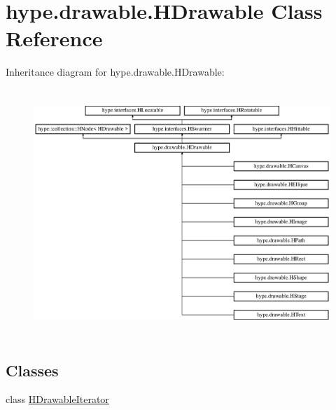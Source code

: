 \hypertarget{classhype_1_1drawable_1_1_h_drawable}{\section{hype.\-drawable.\-H\-Drawable Class Reference}
\label{classhype_1_1drawable_1_1_h_drawable}
}
Inheritance diagram for hype.\-drawable.\-H\-Drawable\-:\begin{figure}[H]
\begin{center}
\leavevmode
\includegraphics[height=9.333334cm]{classhype_1_1drawable_1_1_h_drawable}
\end{center}
\end{figure}
\subsection*{Classes}
\begin{DoxyCompactItemize}
\item 
class \hyperlink{classhype_1_1drawable_1_1_h_drawable_1_1_h_drawable_iterator}{H\-Drawable\-Iterator}
\end{DoxyCompactItemize}
